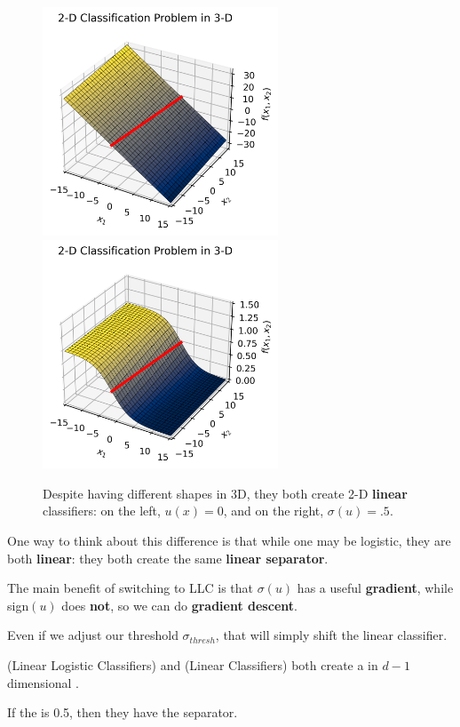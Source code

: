         \begin{figure}[H]
            \includegraphics[width=70mm,scale=0.5]{images/classification_images/2d_classification_in_3d_plane.png}
            \includegraphics[width=70mm,scale=0.5]{images/classification_images/2d_classification_in_3d_sigmoid.png}
            
            \caption*{Despite having different shapes in 3D, they both create 2-D \textbf{linear} classifiers: on the left, $u(x)=0$, and on the right, $\sigma(u)=.5$.}
        \end{figure}
        
        One way to think about this difference is that while one may be logistic, they are both \textbf{linear}: they both create the same \textbf{linear separator}.
        
        The main benefit of switching to LLC is that $\sigma(u)$ has a useful \textbf{gradient}, while sign$(u)$ does \textbf{not}, so we can do \textbf{gradient descent}.
            
        Even if we adjust our threshold $\sigma_{thresh}$, that will simply shift the linear classifier.\\
        
        \begin{concept}
             (Linear Logistic Classifiers) and  (Linear Classifiers) both create a   in $d-1$ dimensional .
            
            If the  is 0.5, then they have the  separator.
        \end{concept}
    